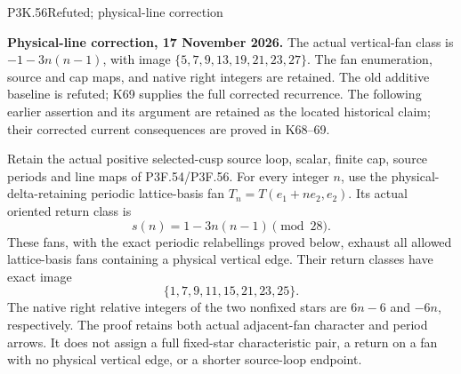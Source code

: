 \begin{statement}{P3K.56}{Refuted; physical-line correction}\par\noindent\textbf{Physical-line correction, 17 November 2026.} The actual vertical-fan class is \(-1-3n(n-1)\), with image \(\{5,7,9,13,19,21,23,27\}\). The fan enumeration, source and cap maps, and native right integers are retained. The old additive baseline is refuted; K69 supplies the full corrected recurrence. The following earlier assertion and its argument are retained as the located historical claim; their corrected current consequences are proved in K68--69.\medskip\par 
Retain the actual positive selected-cusp source loop, scalar, finite
cap, source periods and line maps of P3F.54/P3F.56. For every integer
\(n\), use the physical-delta-retaining periodic lattice-basis fan
\(T_n=T(e_1+ne_2,e_2)\). Its actual oriented return class is
\[
                  s(n)=1-3n(n-1)\pmod{28}.
\]
These fans, with the exact periodic relabellings proved below,
exhaust all allowed lattice-basis fans containing a physical vertical
edge. Their return classes have exact image
\[
                     \{1,7,9,11,15,21,23,25\}.
\]
The native right relative integers of the two nonfixed stars are
\(6n-6\) and \(-6n\), respectively. The proof retains both actual
adjacent-fan character and period arrows. It does not assign a full
fixed-star characteristic pair, a return on a fan with no physical
vertical edge, or a shorter source-loop endpoint.
\end{statement}

